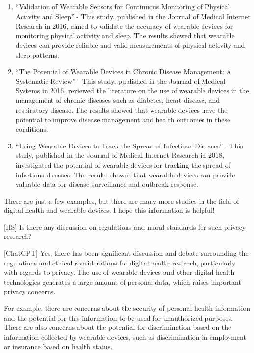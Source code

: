 \documentclass[
]{bxjsbook}
\providecommand{\tightlist}{%
  \setlength{\itemsep}{0pt}\setlength{\parskip}{0pt}}
\theoremstyle{definition}
\theoremstyle{definition}
\theoremstyle{definition}
\theoremstyle{definition}
\theoremstyle{remark}
\begin{document}
\begin{enumerate}
\def\labelenumi{\arabic{enumi}.}
\tightlist
\item
  ``Validation of Wearable Sensors for Continuous Monitoring of Physical Activity and Sleep'' - This study, published in the Journal of Medical Internet Research in 2016, aimed to validate the accuracy of wearable devices for monitoring physical activity and sleep. The results showed that wearable devices can provide reliable and valid measurements of physical activity and sleep patterns.
\item
  ``The Potential of Wearable Devices in Chronic Disease Management: A Systematic Review'' - This study, published in the Journal of Medical Systems in 2016, reviewed the literature on the use of wearable devices in the management of chronic diseases such as diabetes, heart disease, and respiratory disease. The results showed that wearable devices have the potential to improve disease management and health outcomes in these conditions.
\item
  ``Using Wearable Devices to Track the Spread of Infectious Diseases'' - This study, published in the Journal of Medical Internet Research in 2018, investigated the potential of wearable devices for tracking the spread of infectious diseases. The results showed that wearable devices can provide valuable data for disease surveillance and outbreak response.
\end{enumerate}

These are just a few examples, but there are many more studies in the field of digital health and wearable devices. I hope this information is helpful!

{[}HS{]} Is there any discussion on regulations and moral standards for such privacy research?

{[}ChatGPT{]} Yes, there has been significant discussion and debate surrounding the regulations and ethical considerations for digital health research, particularly with regards to privacy. The use of wearable devices and other digital health technologies generates a large amount of personal data, which raises important privacy concerns.

For example, there are concerns about the security of personal health information and the potential for this information to be used for unauthorized purposes. There are also concerns about the potential for discrimination based on the information collected by wearable devices, such as discrimination in employment or insurance based on health status.
\end{document}
